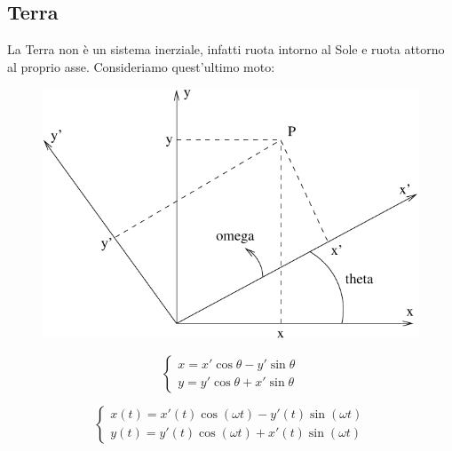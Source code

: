 \subsection{Terra}
La Terra non è un sistema inerziale, infatti ruota intorno al Sole e ruota attorno al proprio asse. Consideriamo quest'ultimo moto:
\begin{figure}[htbp]
   \centering
   \includegraphics[scale=0.7]{immagini/fisica1/apparenti2}
\end{figure}
\begin{equation*}\left\{\begin{array}{l}
x=x'\cos\theta-y'\sin\theta\\
y=y'\cos\theta+x'\sin\theta
\end{array}\right.\end{equation*}

\begin{equation*}\left\{\begin{array}{l}
x(t)=x'(t)\cos(\omega t)-y'(t)\sin(\omega t)\\
y(t)=y'(t)\cos(\omega t)+x'(t)\sin(\omega t)
\end{array}\right.\end{equation*}

